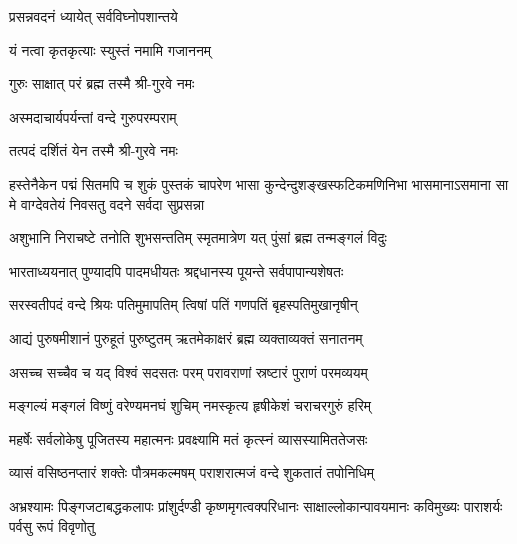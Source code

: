 \label{sec:start}

{प्रसन्नवदनं ध्यायेत् सर्वविघ्नोपशान्तये}

{यं नत्वा कृतकृत्याः स्युस्तं नमामि गजाननम्}


{गुरुः साक्षात् परं ब्रह्म तस्मै श्री-गुरवे नमः}

{अस्मदाचार्यपर्यन्तां वन्दे गुरुपरम्पराम्}

{तत्पदं दर्शितं येन तस्मै श्री-गुरवे नमः}

{हस्तेनैकेन पद्मं सितमपि च शुकं पुस्तकं चापरेण}
{भासा कुन्देन्दुशङ्खस्फटिकमणिनिभा भासमानाऽसमाना}
{सा मे वाग्देवतेयं निवसतु वदने सर्वदा सुप्रसन्ना}



\twolineshloka
{अशुभानि निराचष्टे तनोति शुभसन्ततिम्}
{स्मृतमात्रेण यत् पुंसां ब्रह्म तन्मङ्गलं विदुः}

\twolineshloka
{भारताध्ययनात् पुण्यादपि पादमधीयतः}
{श्रद्दधानस्य पूयन्ते सर्वपापान्यशेषतः}

\twolineshloka
{सरस्वतीपदं वन्दे श्रियः पतिमुमापतिम्}
{त्विषां पतिं गणपतिं बृहस्पतिमुखानृषीन्}

\twolineshloka
{आद्यं पुरुषमीशानं पुरुहूतं  पुरुष्टुतम्}
{ऋतमेकाक्षरं ब्रह्म व्यक्ताव्यक्तं सनातनम्}

\twolineshloka
{असच्च सच्चैव च यद् विश्वं सदसतः परम्}
{परावराणां स्रष्टारं पुराणं परमव्ययम्}

\twolineshloka
{मङ्गल्यं मङ्गलं विष्णुं वरेण्यमनघं शुचिम्}
{नमस्कृत्य हृषीकेशं चराचरगुरुं हरिम्}

\resetShloka


\twolineshloka
{महर्षेः सर्वलोकेषु पूजितस्य महात्मनः}
{प्रवक्ष्यामि मतं कृत्स्नं व्यासस्यामिततेजसः}

\twolineshloka
{व्यासं वसिष्ठनप्तारं शक्तेः पौत्रमकल्मषम्}
{पराशरात्मजं वन्दे शुकतातं तपोनिधिम्}

\fourlineindentedshloka
{अभ्रश्यामः पिङ्गजटाबद्धकलापः}
{प्रांशुर्दण्डी कृष्णमृगत्वक्परिधानः}
{साक्षाल्लोकान्पावयमानः कविमुख्यः}
{पाराशर्यः पर्वसु रूपं विवृणोतु}

